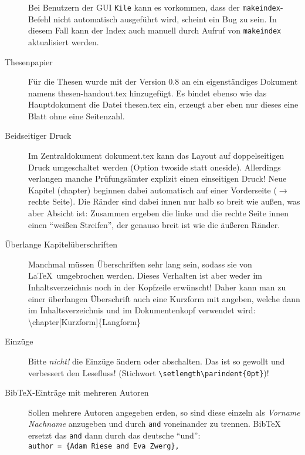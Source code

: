 \begin{description}
      Bei Benutzern der GUI \texttt{Kile} kann es vorkommen,
      dass der \texttt{makeindex}-Befehl nicht automatisch ausgeführt
      wird, scheint ein Bug zu sein. In diesem Fall kann der Index
      auch manuell durch Aufruf von \texttt{makeindex} aktualisiert
      werden.
\item[Thesenpapier]
      Für die Thesen wurde mit der Version 0.8 an ein eigenständiges
      Dokument namens {\ttfamily thesen-handout.tex} hinzugefügt.
      Es bindet ebenso wie das Hauptdokument die Datei
      {\ttfamily thesen.tex} ein, erzeugt aber eben nur dieses
      eine Blatt ohne eine Seitenzahl.
\item[Beidseitiger Druck]
      Im Zentraldokument {\ttfamily dokument.tex} kann das Layout
      auf doppelseitigen Druck umgeschaltet werden (Option
      {\ttfamily twoside} statt {\ttfamily oneside}). Allerdings
      verlangen manche Prüfungsämter explizit einen einseitigen
      Druck! Neue Kapitel ({\ttfamily chapter}) beginnen dabei
      automatisch auf einer Vorderseite (\(\to \) rechte Seite).
      Die Ränder sind dabei innen nur halb so breit wie außen, was
      aber Absicht ist: Zusammen ergeben die linke und die rechte
      Seite innen einen "`weißen Streifen"', der genauso breit ist wie die
      äußeren Ränder.
\item[Überlange Kapitelüberschriften]
      Manchmal müssen Überschriften sehr lang sein, sodass sie von \LaTeX\ 
      umgebrochen werden. Dieses Verhalten ist aber weder im Inhaltsverzeichnis
      noch in der Kopfzeile erwünscht! Daher kann man zu einer überlangen
      Überschrift auch eine Kurzform mit angeben, welche dann im Inhaltsverzeichnis
      und im Dokumentenkopf verwendet wird:\\
      {\ttfamily \textbackslash chapter[Kurzform]\{Langform\}}
\item[Einzüge]
      Bitte \emph{nicht!} die Einzüge ändern oder abschalten. Das ist
      so gewollt und verbessert den Lesefluss! (Stichwort
      \texttt{\textbackslash setlength\textbackslash parindent\{0pt\}})!
\item[BibTeX-Einträge mit mehreren Autoren]
      Sollen mehrere Autoren angegeben erden, so sind diese einzeln
      als \emph{Vorname Nachname} anzugeben und durch \texttt{and}
      voneinander zu trennen. BibTeX ersetzt das \texttt{and} dann
      durch das deutsche "`und"':\\
      \texttt{author = \{Adam Riese and Eva Zwerg\},}
\end{description}




